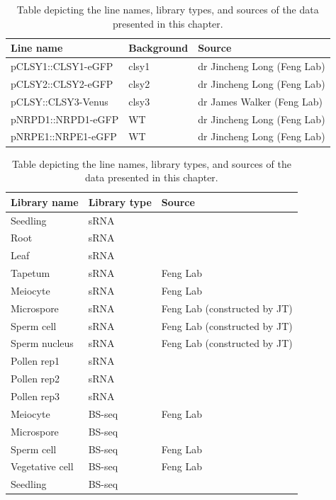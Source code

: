 \begin{table}[htbp]
\centering
\begin{tabular}{|p{5cm}|p{3cm}|p{5cm}|}
\hline
\textbf{Line name} & Background & \textbf{Source} \\
\hline
pCLSY1::CLSY1-eGFP & clsy1 & dr Jincheng Long (Feng Lab) \\
pCLSY2::CLSY2-eGFP & clsy2 & dr Jincheng Long (Feng Lab) \\
pCLSY::CLSY3-Venus & clsy3 &  dr James Walker (Feng Lab) \\
pNRPD1::NRPD1-eGFP & WT & dr Jincheng Long (Feng Lab) \\
pNRPE1::NRPE1-eGFP & WT & dr Jincheng Long (Feng Lab) \\
\hline
\end{tabular}
\begin{tabular}{|p{5cm}|p{3cm}|p{5cm}|} %
\hline
\textbf{Library name} & \textbf{Library type} & \textbf{Source} \\
\hline
Seedling & sRNA & \cite{RN300} \\
Root & sRNA & \cite{RN301}  \\
Leaf & sRNA & \cite {RN302} \\
Tapetum & sRNA & Feng Lab \\
Meiocyte & sRNA & Feng Lab \\
Microspore & sRNA & Feng Lab (constructed by JT) \\
Sperm cell & sRNA & Feng Lab (constructed by JT) \\
Sperm nucleus & sRNA & Feng Lab (constructed by JT) \\
Pollen rep1 & sRNA & \cite{RN303}  \\
Pollen rep2 & sRNA & \cite{RN304}  \\
Pollen rep3 & sRNA & \cite{RN305}  \\
\hline
Meiocyte & BS-seq & Feng Lab \\
Microspore & BS-seq & \cite{RN306}  \\
Sperm cell & BS-seq & Feng Lab \\
Vegetative cell & BS-seq & Feng Lab \\
Seedling & BS-seq & \cite{RN307}  \\
\hline
\end{tabular}
\caption{Table depicting the line names, library types, and sources of the data presented in this chapter.}
\label{ch2:workbyothers}
\end{table}


